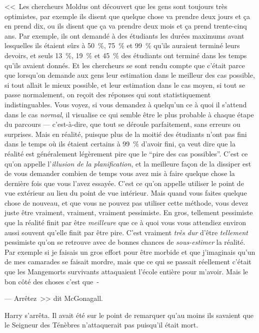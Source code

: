 <<~Les chercheurs Moldus ont découvert que les gens sont toujours très optimistes, par exemple ils disent que quelque chose va prendre deux jours et ça en prend dix, ou ils disent que ça va prendre deux mois et ça prend trente-cinq ans. Par exemple, ils ont demandé à des étudiants les durées maximums avant lesquelles ils étaient sûrs à 50~\%, 75~\% et 99~\% qu'ils auraient terminé leurs devoirs, et seuls 13~\%, 19~\% et 45~\% des étudiants ont terminé dans les temps qu'ils avaient donnés. Et les chercheurs se sont rendu compte que c'était parce que lorsqu'on demande aux gens leur estimation dans le meilleur des cas possible, si tout allait le mieux possible, et leur estimation dans le cas moyen, si tout se passe normalement, on reçoit des réponses qui sont statistiquement indistinguables. Vous voyez, si vous demandez à quelqu'un ce à quoi il s'attend dans le cas \emph{normal}, il visualise ce qui semble être le plus probable à chaque étape du parcours — c'est-à-dire, que tout se déroule parfaitement, sans erreurs ou surprises. Mais en réalité, puisque plus de la moitié des étudiants n'ont pas fini dans le temps où ils étaient certains à 99~\% d'avoir fini, ça veut dire que la réalité est généralement légèrement pire que le “pire des cas possibles”. C'est ce qu'on appelle l'\emph{illusion de la planification}, et la meilleure façon de la dissiper est de vous demander combien de temps vous avez mis à faire quelque chose la dernière fois que vous l'avez essayée. C'est ce qu'on appelle utiliser le point de vue extérieur au lieu du point de vue intérieur. Mais quand vous faites quelque chose de nouveau, et que vous ne pouvez pas utiliser cette méthode, vous devez juste être vraiment, vraiment, vraiment pessimiste. En gros, tellement pessimiste que la réalité finit par être \emph{meilleure} que ce à quoi vous vous attendiez environ aussi souvent qu'elle finit par être pire. C'est vraiment \emph{très dur} d'être \emph{tellement} pessimiste qu'on se retrouve avec de bonnes chances de \emph{sous-estimer} la réalité. Par exemple si je faisais un gros effort pour être morbide et que j'imaginais qu'un de mes camarades se faisait mordre, mais que ce qui se passait réellement c'était que les Mangemorts survivants attaquaient l'école entière pour m'avoir. Mais le bon côté des choses c'est que~-

--- Arrêtez~>> dit McGonagall.

Harry s'arrêta. Il avait été sur le point de remarquer qu'au moins ils savaient que le Seigneur des Ténèbres n'attaquerait pas puisqu'il était mort.

